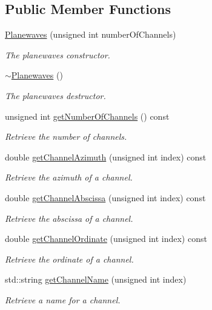 \subsection*{Public Member Functions}
\begin{DoxyCompactItemize}
\item 
\hyperlink{class_hoa2_d_1_1_planewaves_a43c146e275c45666c7b9a98fc90b0498}{Planewaves} (unsigned int number\-Of\-Channels)
\begin{DoxyCompactList}\small\item\em The planewaves constructor. \end{DoxyCompactList}\item 
\hyperlink{class_hoa2_d_1_1_planewaves_ac629a03db1de48ab96be4485f6553d37}{$\sim$\-Planewaves} ()
\begin{DoxyCompactList}\small\item\em The planewaves destructor. \end{DoxyCompactList}\item 
unsigned int \hyperlink{class_hoa2_d_1_1_planewaves_a4bf0de6ae4ac7ac03fc552d477237a85}{get\-Number\-Of\-Channels} () const 
\begin{DoxyCompactList}\small\item\em Retrieve the number of channels. \end{DoxyCompactList}\item 
double \hyperlink{class_hoa2_d_1_1_planewaves_a52c4f8b05137ab56e82b0e076d7f5d3a}{get\-Channel\-Azimuth} (unsigned int index) const 
\begin{DoxyCompactList}\small\item\em Retrieve the azimuth of a channel. \end{DoxyCompactList}\item 
double \hyperlink{class_hoa2_d_1_1_planewaves_aab20597fa76482d7a907b2e39cc5be25}{get\-Channel\-Abscissa} (unsigned int index) const 
\begin{DoxyCompactList}\small\item\em Retrieve the abscissa of a channel. \end{DoxyCompactList}\item 
double \hyperlink{class_hoa2_d_1_1_planewaves_ade9d19725af0826e02b43bcf10a4bc73}{get\-Channel\-Ordinate} (unsigned int index) const 
\begin{DoxyCompactList}\small\item\em Retrieve the ordinate of a channel. \end{DoxyCompactList}\item 
std\-::string \hyperlink{class_hoa2_d_1_1_planewaves_a66b40a511ac3dd9f3ab1102e98370dbd}{get\-Channel\-Name} (unsigned int index)
\begin{DoxyCompactList}\small\item\em Retrieve a name for a channel. \end{DoxyCompactList}\end{DoxyCompactItemize}
